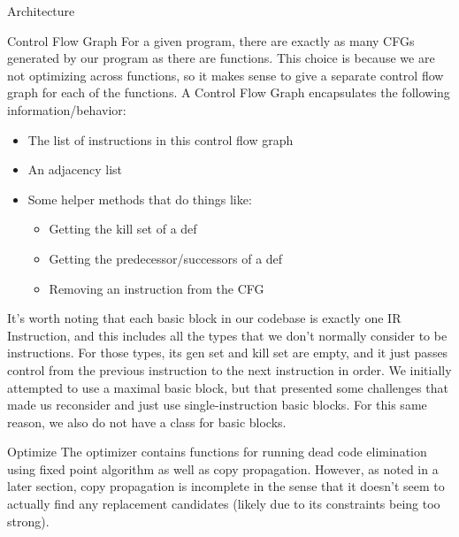 \documentclass[letterpaper,12pt]{article}
\theoremstyle{definition}
\begin{document}
\begin{section}{Architecture}
		\begin{subsection}{Control Flow Graph}
			For a given program, there are exactly as many CFGs generated by our program as there are functions. This choice is because we are not optimizing across functions, so it makes sense to give a separate control flow graph for each of the functions. A Control Flow Graph encapsulates the following information/behavior:
			\begin{itemize}
				\item The list of instructions in this control flow graph
				\item An adjacency list
				\item Some helper methods that do things like:
					\begin{itemize}
						\item Getting the kill set of a def
						\item Getting the predecessor/successors of a def
						\item Removing an instruction from the CFG
					\end{itemize}
			\end{itemize}
			It's worth noting that each basic block in our codebase is exactly one IR Instruction, and this includes all the types that we don't normally consider to be instructions. For those types, its gen set and kill set are empty, and it just passes control from the previous instruction to the next instruction in order. We initially attempted to use a maximal basic block, but that presented some challenges that made us reconsider and just use single-instruction basic blocks. For this same reason, we also do not have a class for basic blocks.
		\end{subsection}

		\begin{subsection}{Optimize}
			The optimizer contains functions for running dead code elimination using fixed point algorithm as well as copy propagation. However, as noted in a later section, copy propagation is incomplete in the sense that it doesn't seem to actually find any replacement candidates (likely due to its constraints being too strong).


\end{subsection}
\end{section}
\end{document}
